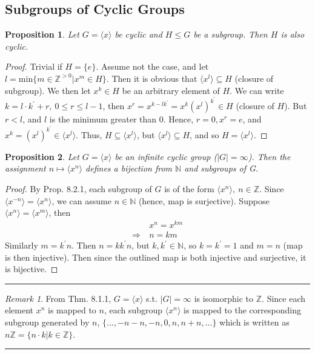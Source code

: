\documentclass{article}
\newtheorem{theorem}{Proposition}[section]
\theoremstyle{definition}
\theoremstyle{remark}
\newtheorem*{remark}{Remark}
\begin{document}
\subsection{Subgroups of Cyclic Groups}
\begin{theorem}
Let $G=\langle x\rangle$ be cyclic and $H\leq G$ be a subgroup. Then $H$ is also cyclic.\\
\end{theorem}
\begin{proof}
Trivial if $H=\lbrace e\rbrace$. Assume not the case, and let $l=\mathrm{min}\lbrace m\in\mathbb{Z}^{>0}|x^m\in H\rbrace $. Then it is obvious that $\langle x^l\rangle\subseteq H$ (closure of subgroup). We then let $x^k \in H$ be an arbitrary element of $H$. We can write $k=l\cdot k^{\prime}+r,~0\leq r\leq l-1$, then $x^r=x^{k-lk^{\prime}}=x^k(x^l)^{k^{\prime}}\in H$ (closure of $H$). But $r<l$, and $l$ is the minimum greater than $0$. Hence, $r=0,x^r=e$, and $x^k=(x^l)^{k^{\prime}}\in \langle x^l\rangle$.
Thus, $H\subseteq\langle x^l\rangle$, but $\langle x^l\rangle\subseteq H$, and so $H=\langle x^l\rangle$.
\end{proof}
\begin{theorem}
Let $G=\langle x\rangle$ be an infinite cyclic group ($|G|=\infty$). Then the assignment $n\mapsto\langle x^n\rangle$ defines a bijection from $\mathbb{N}$ and subgroups of G.\\
\end{theorem}
\begin{proof}
By Prop. 8.2.1, each subgroup of $G$ is of the form $\langle x^n\rangle,~ n\in\mathbb{Z}$. Since $\langle x^{-n}\rangle = \langle x^n\rangle$, we can assume $n\in \mathbb{N}$ (hence, map is surjective). Suppose $\langle x^n\rangle=\langle x^m\rangle$, then
\begin{align*}
&x^n=x^{km}\\
\Rightarrow~&n=km
\end{align*}
Similarly $m=k^{\prime}n$. Then $n=kk^{\prime}n$, but $k,k^{\prime}\in \mathbb{N}$, so $k=k^{\prime}=1$ and $m=n$ (map is then injective). Then since the outlined map is both injective and surjective, it is bijective.
\end{proof}
\hrule
\vspace{2mm}
\begin{remark}
From Thm. 8.1.1, $G=\langle x\rangle$ s.t. $|G|=\infty$ is isomorphic to $\mathbb{Z}$. Since each element $x^n$ is mapped to $n$, each subgroup $\langle x^n\rangle$ is mapped to the corresponding subgroup generated by $n$, $\lbrace ..., -n-n, -n, 0, n, n+n,...\rbrace$ which is written as $n\mathbb{Z}=\lbrace n\cdot k | k\in \mathbb{Z}\rbrace$.\\
\end{remark}
\hrule
\newpage
\end{document}
